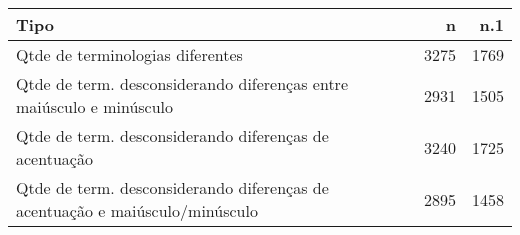 \begin{table}[ht]
\centering
\begin{tabular}{lrr}
  \hline
Tipo & n & n.1 \\ 
  \hline
Qtde de terminologias diferentes & 3275 & 1769 \\ 
  Qtde de term. desconsiderando diferenças entre maiúsculo e minúsculo & 2931 & 1505 \\ 
  Qtde de term. desconsiderando diferenças de acentuação & 3240 & 1725 \\ 
  Qtde de term. desconsiderando diferenças de acentuação e
          maiúsculo/minúsculo & 2895 & 1458 \\ 
   \hline
\end{tabular}
\end{table}
